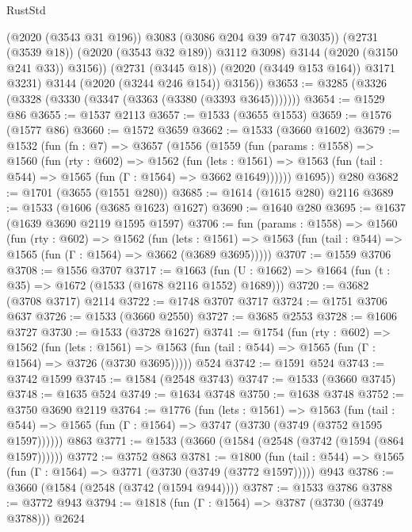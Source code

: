 \begin{lexlean}{RustStd}
\begin{coremodule}
                  (@2020 (@3543 @31 @196))
                  @3083
                  (@3086 @204 @39 @747 @3035))
                (@2731 (@3539 @18))
                (@2020 (@3543 @32 @189))
                @3112
                @3098)
              @3144
              (@2020 (@3150 @241 @33))
              @3156))
          (@2731 (@3445 @18))
          (@2020 (@3449 @153 @164))
          @3171
          @3231)
        @3144
        (@2020 (@3244 @246 @154))
        @3156))
@3653 := @3285 (@3326 (@3328 (@3330 (@3347 (@3363 (@3380 (@3393 @3645)))))))
@3654 := @1529 @86
@3655 := @1537 @2113
@3657 := @1533 (@3655 @1553)
@3659 := @1576 (@1577 @86)
@3660 := @1572 @3659
@3662 := @1533 (@3660 @1602)
@3679 := @1532
    (fun (fn : @7) =>
    @3657
      (@1556
        (@1559
          (fun (params : @1558) =>
          @1560
            (fun (rty : @602) =>
            @1562
              (fun (lets : @1561) =>
              @1563 (fun (tail : @544) => @1565 (fun (Γ : @1564) => @3662 @1649))))))
        @1695))
    @280
@3682 := @1701 (@3655 (@1551 @280))
@3685 := @1614 (@1615 @280) @2116
@3689 := @1533 (@1606 (@3685 @1623) @1627)
@3690 := @1640 @280
@3695 := @1637 (@1639 @3690 @2119 @1595 @1597)
@3706 := fun (params : @1558) =>
  @1560
    (fun (rty : @602) =>
    @1562
      (fun (lets : @1561) =>
      @1563 (fun (tail : @544) => @1565 (fun (Γ : @1564) => @3662 (@3689 @3695)))))
@3707 := @1559 @3706
@3708 := @1556 @3707
@3717 := @1663 (fun (U : @1662) => @1664 (fun (t : @35) => @1672 (@1533 (@1678 @2116 @1552) @1689)))
@3720 := @3682 (@3708 @3717) @2114
@3722 := @1748 @3707 @3717
@3724 := @1751 @3706 @637
@3726 := @1533 (@3660 @2550)
@3727 := @3685 @2553
@3728 := @1606 @3727
@3730 := @1533 (@3728 @1627)
@3741 := @1754
    (fun (rty : @602) =>
    @1562
      (fun (lets : @1561) =>
      @1563 (fun (tail : @544) => @1565 (fun (Γ : @1564) => @3726 (@3730 @3695)))))
    @524
@3742 := @1591 @524
@3743 := @3742 @1599
@3745 := @1584 (@2548 @3743)
@3747 := @1533 (@3660 @3745)
@3748 := @1635 @524
@3749 := @1634 @3748
@3750 := @1638 @3748
@3752 := @3750 @3690 @2119
@3764 := @1776
    (fun (lets : @1561) =>
    @1563
      (fun (tail : @544) => @1565 (fun (Γ : @1564) => @3747 (@3730 (@3749 (@3752 @1595 @1597))))))
    @863
@3771 := @1533 (@3660 (@1584 (@2548 (@3742 (@1594 (@864 @1597))))))
@3772 := @3752 @863
@3781 := @1800
    (fun (tail : @544) => @1565 (fun (Γ : @1564) => @3771 (@3730 (@3749 (@3772 @1597)))))
    @943
@3786 := @3660 (@1584 (@2548 (@3742 (@1594 @944))))
@3787 := @1533 @3786
@3788 := @3772 @943
@3794 := @1818 (fun (Γ : @1564) => @3787 (@3730 (@3749 @3788))) @2624

\end{coremodule}
\end{lexlean}
